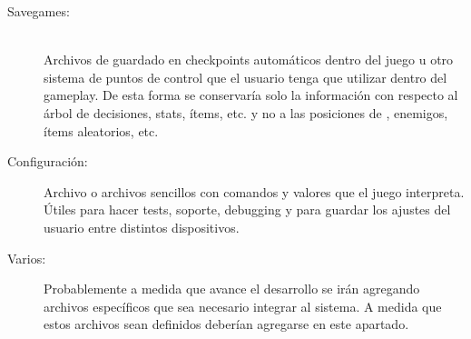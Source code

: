 \begin{description}
\item[Savegames:] \hfill \\ Archivos de guardado en checkpoints automáticos dentro del juego u otro sistema de puntos de control que el usuario tenga que utilizar dentro del gameplay. De esta forma se conservaría solo la información con respecto al árbol de decisiones, stats, ítems, etc. y no a las posiciones de , enemigos, ítems aleatorios, etc.

\item[Configuración:] Archivo o archivos sencillos con comandos y valores que el juego interpreta. Útiles para hacer tests, soporte, debugging y para guardar los ajustes del usuario entre distintos dispositivos.

\item[Varios:] Probablemente a medida que avance el desarrollo se irán agregando archivos específicos que sea necesario integrar al sistema. A medida que estos archivos sean definidos deberían agregarse en este apartado.
\end{description}

